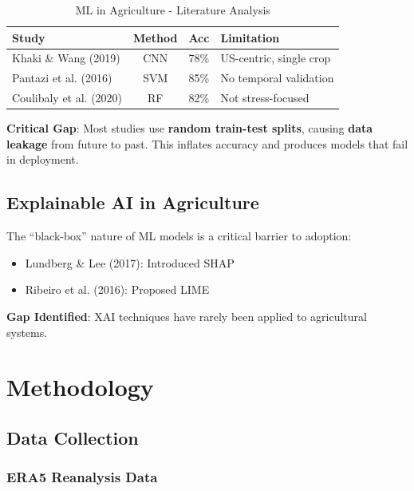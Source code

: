 \documentclass[conference,11pt]{IEEEtran}
\begin{document}
\begin{table}[h]
\centering
\caption{ML in Agriculture - Literature Analysis}
\begin{tabular}{|l|c|c|p{2.5cm}|}
\hline
\textbf{Study} & \textbf{Method} & \textbf{Acc} & \textbf{Limitation} \\
\hline
Khaki \& Wang (2019) & CNN & 78\% & US-centric, single crop \\
\hline
Pantazi et al. (2016) & SVM & 85\% & No temporal validation \\
\hline
Coulibaly et al. (2020) & RF & 82\% & Not stress-focused \\
\hline
\end{tabular}
\end{table}

\textbf{Critical Gap}: Most studies use \textbf{random train-test splits}, causing \textbf{data leakage} from future to past. This inflates accuracy and produces models that fail in deployment.

\subsection{Explainable AI in Agriculture}

The ``black-box'' nature of ML models is a critical barrier to adoption:
\begin{itemize}
    \item Lundberg \& Lee (2017): Introduced SHAP \cite{lundberg2017}
    \item Ribeiro et al. (2016): Proposed LIME \cite{ribeiro2016}
\end{itemize}

\textbf{Gap Identified}: XAI techniques have rarely been applied to agricultural systems.

\section{Methodology}

\subsection{Data Collection}

\subsubsection{ERA5 Reanalysis Data}
\end{document}
